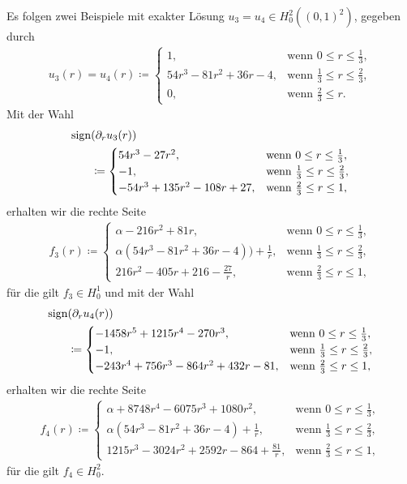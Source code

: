 Es folgen zwei Beispiele mit exakter Lösung $u_3=u_4 \in H^2_0((0,1)^2)$, 
gegeben durch 
\begin{align*}
  u_3(r)=u_4(r)\coloneqq 
  \begin{cases}
    1, & \text{wenn } 0\leq r\leq\frac{1}{3},\\
    54r^3 - 81r^2 + 36r - 4, & 
    \text{wenn } \frac{1}{3}\leq r\leq \frac{2}{3},\\
    0, & \text{wenn } \frac{2}{3}\leq r.
  \end{cases}
\end{align*}
Mit der Wahl
\begin{align*}
  \operatorname{sign}&(\partial_r u_3(r)) \\
  &\coloneqq 
  \begin{cases}
    54r^3-27r^2, & \text{wenn } 0\leq r\leq\frac{1}{3},\\
    -1, & \text{wenn } \frac{1}{3}\leq r\leq \frac{2}{3},\\
    -54r^3 + 135r^2 - 108r + 27, & \text{wenn } \frac{2}{3}\leq r\leq 1,
  \end{cases}
\end{align*}
erhalten wir die rechte Seite
\begin{align*}
  f_3(r)\coloneqq 
  \begin{cases}
    \alpha - 216r^2 + 81r, &
    \text{wenn } 0\leq r\leq\frac{1}{3},\\
    \alpha\left(54r^3 - 81r^2 + 36r - 4\right)) + \frac{1}{r}, & 
    \text{wenn } \frac{1}{3}\leq r\leq \frac{2}{3},\\
    216r^2 - 405r + 216 - \frac{27}{r}, & 
    \text{wenn } \frac{2}{3}\leq r\leq 1,
  \end{cases}
\end{align*}
für die gilt $f_3\in H^1_0$
und mit der Wahl
\begin{align*}
  \operatorname{sign}&(\partial_r u_4(r)) \\
  &\coloneqq 
  \begin{cases}
    -1458r^5 + 1215r^4 - 270r^3, & \text{wenn } 0\leq r\leq\frac{1}{3},\\
    -1, & \text{wenn } \frac{1}{3}\leq r\leq \frac{2}{3},\\
    -243r^4 + 756r^3 - 864r^2 + 432r - 81, 
    & \text{wenn } \frac{2}{3}\leq r\leq 1,
  \end{cases}
\end{align*}
erhalten wir die rechte Seite
\begin{align*}
  f_4(r)\coloneqq 
  \begin{cases}
    \alpha + 8748r^4 - 6075r^3 + 1080r^2, &
    \text{wenn } 0\leq r\leq\frac{1}{3},\\
    \alpha\left(54r^3 - 81r^2 + 36r - 4\right) + \frac{1}{r}, & 
    \text{wenn } \frac{1}{3}\leq r\leq \frac{2}{3},\\
    1215r^3 - 3024r^2 + 2592r - 864 + \frac{81}{r}, & 
    \text{wenn } \frac{2}{3}\leq r\leq 1,
  \end{cases}
\end{align*}
für die gilt $f_4\in H^2_0$.

